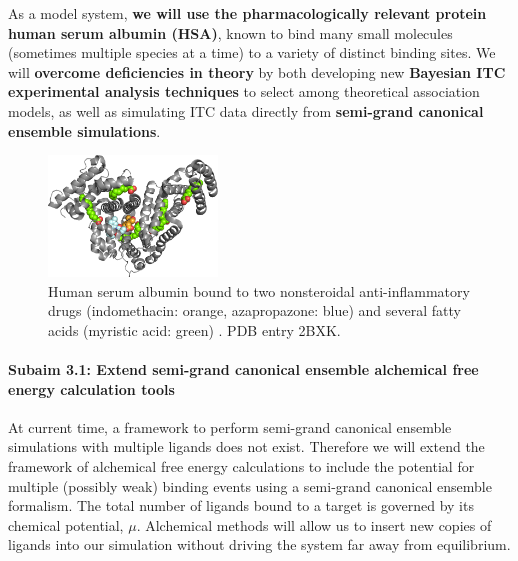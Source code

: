 \documentclass[10pt,final]{article}
\newcommand{\subsubsubsection}[1]{\paragraph*{#1}}
\begin{document}
As a model system, \textbf{we will use the pharmacologically relevant protein human serum albumin (HSA)}, known to bind many small molecules (sometimes multiple species at a time) to a variety of distinct binding sites.
We will \textbf{overcome deficiencies in theory} by both developing new \textbf{Bayesian ITC experimental analysis techniques} to select among theoretical association models, as well as simulating ITC data directly from \textbf{semi-grand canonical ensemble simulations}.

\begin{figure}[H]
	\centering
	\includegraphics[width=0.4\textwidth]{figures/HSA.png}
	\caption{Human serum albumin bound to two nonsteroidal anti-inflammatory drugs (indomethacin: orange, azapropazone: blue) and several fatty acids (myristic acid: green) \cite{Ghuman2005a}. PDB entry 2BXK.}
	\label{figure:albumin}
\end{figure} 

\subsubsubsection{Subaim 3.1: Extend semi-grand canonical ensemble alchemical free energy calculation tools}
At current time, a framework to perform semi-grand canonical ensemble simulations with multiple ligands does not exist. Therefore we will extend the framework of alchemical free energy calculations to include the potential for multiple (possibly weak) binding events using a semi-grand canonical ensemble formalism. 
The total number of ligands bound to a target is governed by its chemical potential, $\mu$. Alchemical methods will allow us to insert new copies of ligands into our simulation without driving the system far away from equilibrium. 

\begin{center}
\end{center}
\end{document}

